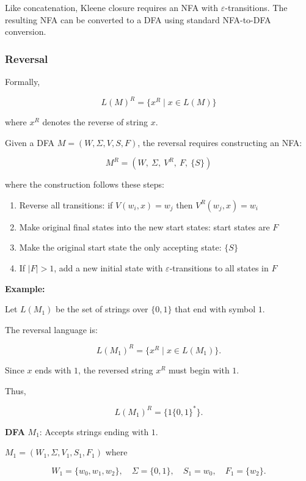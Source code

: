\documentclass[12pt,a4paper,openany]{article}
\begin{document}
Like concatenation, Kleene closure requires an NFA with $\varepsilon$-transitions. The resulting NFA can be converted to a DFA using standard NFA-to-DFA conversion.

\subsubsection{Reversal}

Formally,

\[L(M)^R = \{ x^R \mid x \in L(M) \}\]

where $x^R$ denotes the reverse of string $x$.

Given a DFA $M = (W, \Sigma, V, S, F)$, the reversal requires constructing an NFA:

\[M^R = (W,\ \Sigma,\ V^R,\ F,\ \{S\})\]

where the construction follows these steps:
\begin{enumerate}
    \item Reverse all transitions: if $V(w_i, x) = w_j$ then $V^R(w_j, x) = w_i$
    \item Make original final states into the new start states: start states are $F$
    \item Make the original start state the only accepting state: $\{S\}$
    \item If $|F| > 1$, add a new initial state with $\varepsilon$-transitions to all states in $F$
\end{enumerate}

\textbf{Example:}

Let $L(M_1)$ be the set of strings over $\{0,1\}$ that end with symbol $1$.

The reversal language is:

\[
L(M_1)^R = \{ x^R \mid x \in L(M_1) \}.
\]

Since $x$ ends with $1$, the reversed string $x^R$ must begin with $1$.

Thus,

\[
L(M_1)^R = \{1\{0,1\}^*\}.
\]

\textbf{DFA} $M_1$: Accepts strings ending with $1$.

$M_1 = (W_1,\Sigma,V_1,S_1,F_1)$ where

\[
W_1 = \{w_0,w_1,w_2\}, \quad
\Sigma = \{0,1\}, \quad
S_1 = w_0, \quad
F_1 = \{w_2\}.
\]

\begin{center}
\end{center}
\end{document}
